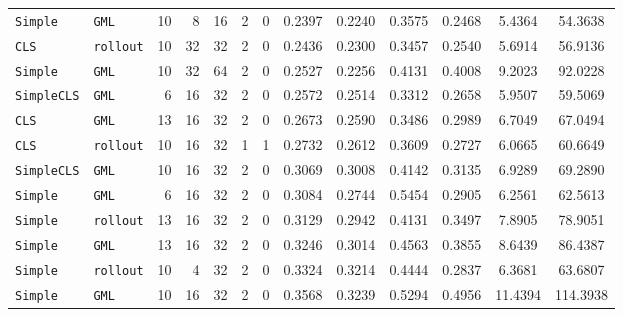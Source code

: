 \begin{table}[H]
\begin{tabular}{
l
l
r
r
r
r
r
S[table-format=1.4]
S[table-format=1.4]
S[table-format=2.4]
S[table-format=2.4]
S[table-format=3.4]
S[table-format=4.4]
}
\texttt{Simple} & \texttt{GML} & 10 & 8 & 16 & \textcolor{gray!55}{2} & \textcolor{gray!55}{0} & 0.2397 & 0.2240 & 0.3575 & 0.2468 & 5.4364 & 54.3638 \\
\texttt{CLS} & \texttt{rollout} & \textcolor{gray!55}{10} & 32 & \textcolor{gray!55}{32} & \textcolor{gray!55}{2} & \textcolor{gray!55}{0} & 0.2436 & 0.2300 & 0.3457 & 0.2540 & 5.6914 & 56.9136 \\
\texttt{Simple} & \texttt{GML} & 10 & 32 & 64 & \textcolor{gray!55}{2} & \textcolor{gray!55}{0} & 0.2527 & 0.2256 & 0.4131 & 0.4008 & 9.2023 & 92.0228 \\
\texttt{SimpleCLS} & \texttt{GML} & 6 & \textcolor{gray!55}{16} & \textcolor{gray!55}{32} & \textcolor{gray!55}{2} & \textcolor{gray!55}{0} & 0.2572 & 0.2514 & 0.3312 & 0.2658 & 5.9507 & 59.5069 \\
\texttt{CLS} & \texttt{GML} & 13 & \textcolor{gray!55}{16} & \textcolor{gray!55}{32} & \textcolor{gray!55}{2} & \textcolor{gray!55}{0} & 0.2673 & 0.2590 & 0.3486 & 0.2989 & 6.7049 & 67.0494 \\
\texttt{CLS} & \texttt{rollout} & 10 & \textcolor{gray!55}{16} & \textcolor{gray!55}{32} & 1 & 1 & 0.2732 & 0.2612 & 0.3609 & 0.2727 & 6.0665 & 60.6649 \\
\texttt{SimpleCLS} & \texttt{GML} & 10 & \textcolor{gray!55}{16} & \textcolor{gray!55}{32} & \textcolor{gray!55}{2} & \textcolor{gray!55}{0} & 0.3069 & 0.3008 & 0.4142 & 0.3135 & 6.9289 & 69.2890 \\
\texttt{Simple} & \texttt{GML} & 6 & \textcolor{gray!55}{16} & \textcolor{gray!55}{32} & \textcolor{gray!55}{2} & \textcolor{gray!55}{0} & 0.3084 & 0.2744 & 0.5454 & 0.2905 & 6.2561 & 62.5613 \\
\texttt{Simple} & \texttt{rollout} & 13 & \textcolor{gray!55}{16} & \textcolor{gray!55}{32} & \textcolor{gray!55}{2} & \textcolor{gray!55}{0} & 0.3129 & 0.2942 & 0.4131 & 0.3497 & 7.8905 & 78.9051 \\
\texttt{Simple} & \texttt{GML} & 13 & \textcolor{gray!55}{16} & \textcolor{gray!55}{32} & \textcolor{gray!55}{2} & \textcolor{gray!55}{0} & 0.3246 & 0.3014 & 0.4563 & 0.3855 & 8.6439 & 86.4387 \\
\texttt{Simple} & \texttt{rollout} & \textcolor{gray!55}{10} & 4 & \textcolor{gray!55}{32} & \textcolor{gray!55}{2} & \textcolor{gray!55}{0} & 0.3324 & 0.3214 & 0.4444 & 0.2837 & 6.3681 & 63.6807 \\
\texttt{Simple} & \texttt{GML} & \textcolor{gray!55}{10} & \textcolor{gray!55}{16} & \textcolor{gray!55}{32} & \textcolor{gray!55}{2} & \textcolor{gray!55}{0} & 0.3568 & 0.3239 & 0.5294 & 0.4956 & 11.4394 & 114.3938 \\

\end{tabular}
\end{table}
